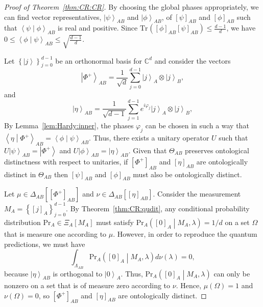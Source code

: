 \documentclass[DIV=calc,paper=a4,fontsize=11pt,twocolumn]{scrartcl} %
\theoremstyle{definition}
\theoremstyle{plain}
\newcommand{\Ket}[1]{\ensuremath{\left \vert #1 \right \rangle}}
\newcommand{\BraKet}[2]{\ensuremath{\left \langle #1 \middle \vert #2
\right \rangle}}
\newcommand{\Proj}[1]{\ensuremath{\left [ #1 \right ]}}
\newcommand{\Tr}[2][]{\ensuremath{\text{Tr}_{#1} \left ( #2 \right )}}
\begin{document}
\begin{proof}[Proof of Theorem~\ref{thm:CR:CR}]
By choosing the global phases appropriately, we can find vector
representatives, $\Ket{\psi}_{AB}$ and $\Ket{\phi}_{AB}$, of
$\Proj{\psi}_{AB}$ and $\Proj{\phi}_{AB}$ such that
$\BraKet{\psi}{\phi}_{AB}$ is real and positive.  Since
$\Tr{\Proj{\phi}_{AB}\Proj{\psi}_{AB}} \leq \frac{d-1}{d}$, we have
$0 \leq \BraKet{\phi}{\psi}_{AB} \leq \sqrt{\frac{d-1}{d}}$.

Let $\left \{ \Ket{j} \right \}_{j=0}^{d-1}$ be an orthonormal basis
for $\mathbb{C}^d$ and consider the vectors
\begin{equation}
\Ket{\Phi^+}_{AB} = \frac{1}{\sqrt{d}}\sum_{j=0}^{d-1} \Ket{j}_A
\otimes \Ket{j}_B,
\end{equation}
and
\begin{equation}
\Ket{\eta}_{AB} = \frac{1}{\sqrt{d-1}}\sum_{j=1}^{d-1} e^{i
\varphi_j} \Ket{j}_A \otimes \Ket{j}_B,
\end{equation}
By Lemma~\ref{lem:Hardy:inner}, the phases $\varphi_j$ can be chosen
in such a way that $\BraKet{\eta}{\Phi^+}_{AB} =
\BraKet{\phi}{\psi}_{AB}$.  Thus, there exists a unitary operator
$U$ such that $U \Ket{\psi}_{AB} = \Ket{\Phi^+}$ and
$U\Ket{\phi}_{AB} = \Ket{\eta}_{AB}$.  Given that $\Theta_{AB}$
preserves ontological distinctness with respect to unitaries, if
$\Proj{\Phi^+}_{AB}$ and $\Proj{\eta}_{AB}$ are ontologically
distinct in $\Theta_{AB}$ then $\Proj{\psi}_{AB}$ and
$\Proj{\phi}_{AB}$ must also be ontologically distinct.

Let $\mu \in \Delta_{AB} \left [ \Proj{\Phi^+}_{AB} \right ]$ and
$\nu \in \Delta_{AB} \left [ \Proj{\eta}_{AB} \right ]$.  Consider
the measurement $M_A = \left \{ \Proj{j}_A \right \}_{j=0}^{d-1}$.
By Theorem~\ref{thm:CR:qudit}, any conditional probability
distribution $\text{Pr}_A \in \Xi_A[M_A]$ must satisfy $\text{Pr}_A
\left ( \Proj{0}_A \middle | M_A, \lambda \right ) = 1/d$ on a set
$\Omega$ that is measure one according to $\mu$.  However, in order
to reproduce the quantum predictions, we must have
\begin{equation}
\int_{\Lambda_{AB}} \text{Pr}_A \left ( \Proj{0}_A \middle | M_A,
\lambda \right ) d\nu(\lambda) = 0,
\end{equation}
because $\Ket{\eta}_{AB}$ is orthogonal to $\Ket{0}_A$.  Thus,
$\text{Pr}_A \left ( \Proj{0}_A \middle | M_A, \lambda \right )$ can
only be nonzero on a set that is of measure zero according to $\nu$.
Hence, $\mu(\Omega) = 1$ and $\nu(\Omega) = 0$, so
$\Proj{\Phi^+}_{AB}$ and $\Proj{\eta}_{AB}$ are ontologically
distinct.
\end{proof}
\end{document}
